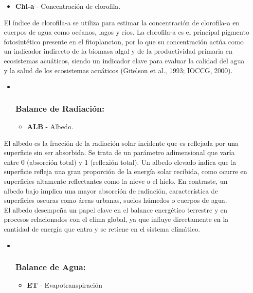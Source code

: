 \documentclass[
]{book}
\providecommand{\tightlist}{%
  \setlength{\itemsep}{0pt}\setlength{\parskip}{0pt}}
\begin{document}
\begin{itemize}
\tightlist
\item
  \textbf{Chl-a} - Concentración de clorofila.
\end{itemize}

El índice de clorofila-a se utiliza para estimar la concentración de clorofila-a en cuerpos de agua como océanos, lagos y ríos. La clorofila-a es el principal pigmento fotosintético presente en el fitoplancton, por lo que su concentración actúa como un indicador indirecto de la biomasa algal y de la productividad primaria en ecosistemas acuáticos, siendo un indicador clave para evaluar la calidad del agua y la salud de los ecosistemas acuáticos (Gitelson et al., 1993; IOCCG, 2000).

\begin{itemize}
\item ~
  \subsubsection{\texorpdfstring{\textbf{Balance de Radiación:}}{Balance de Radiación:}}\label{balance-de-radiaciuxf3n}

  \begin{itemize}
  \tightlist
  \item
    \textbf{ALB} - Albedo.
  \end{itemize}
\end{itemize}

El albedo es la fracción de la radiación solar incidente que es reflejada por una superficie sin ser absorbida. Se trata de un parámetro adimensional que varía entre 0 (absorción total) y 1 (reflexión total). Un albedo elevado indica que la superficie refleja una gran proporción de la energía solar recibida, como ocurre en superficies altamente reflectantes como la nieve o el hielo. En contraste, un albedo bajo implica una mayor absorción de radiación, característica de superficies oscuras como áreas urbanas, suelos húmedos o cuerpos de agua.\\
El albedo desempeña un papel clave en el balance energético terrestre y en procesos relacionados con el clima global, ya que influye directamente en la cantidad de energía que entra y se retiene en el sistema climático.

\begin{itemize}
\item ~
  \subsubsection{\texorpdfstring{\textbf{Balance de Agua:}}{Balance de Agua:}}\label{balance-de-agua}

  \begin{itemize}
  \tightlist
  \item
    \textbf{ET} - Evapotranspiración
  \end{itemize}
\end{itemize}
\end{document}
